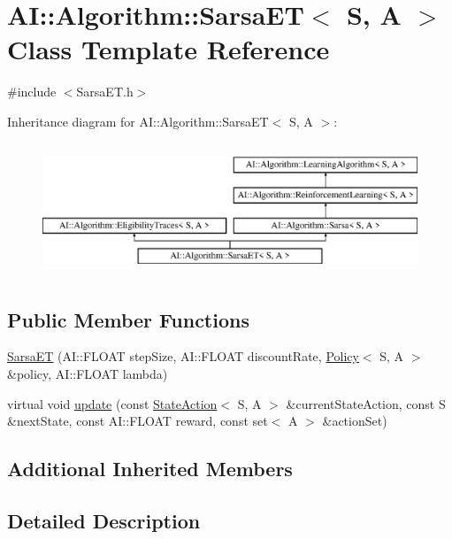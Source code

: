 \hypertarget{classAI_1_1Algorithm_1_1SarsaET}{\section{A\-I\-:\-:Algorithm\-:\-:Sarsa\-E\-T$<$ S, A $>$ Class Template Reference}
\label{classAI_1_1Algorithm_1_1SarsaET}
}


{\ttfamily \#include $<$Sarsa\-E\-T.\-h$>$}

Inheritance diagram for A\-I\-:\-:Algorithm\-:\-:Sarsa\-E\-T$<$ S, A $>$\-:\begin{figure}[H]
\begin{center}
\leavevmode
\includegraphics[height=4.000000cm]{classAI_1_1Algorithm_1_1SarsaET}
\end{center}
\end{figure}
\subsection*{Public Member Functions}
\begin{DoxyCompactItemize}
\item 
\hyperlink{classAI_1_1Algorithm_1_1SarsaET_a992281468719624306939da1f865db37}{Sarsa\-E\-T} (A\-I\-::\-F\-L\-O\-A\-T step\-Size, A\-I\-::\-F\-L\-O\-A\-T discount\-Rate, \hyperlink{classAI_1_1Algorithm_1_1Policy}{Policy}$<$ S, A $>$ \&policy, A\-I\-::\-F\-L\-O\-A\-T lambda)
\item 
virtual void \hyperlink{classAI_1_1Algorithm_1_1SarsaET_adf13376b7ec8fdfa2b19ffadb1aa81e7}{update} (const \hyperlink{classAI_1_1StateAction}{State\-Action}$<$ S, A $>$ \&current\-State\-Action, const S \&next\-State, const A\-I\-::\-F\-L\-O\-A\-T reward, const set$<$ A $>$ \&action\-Set)
\end{DoxyCompactItemize}
\subsection*{Additional Inherited Members}


\subsection{Detailed Description}
